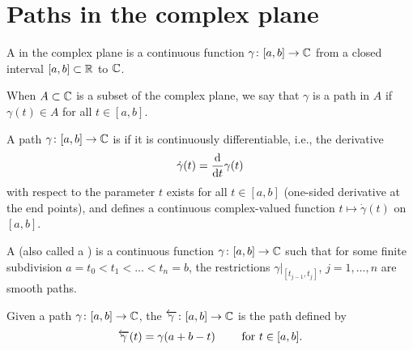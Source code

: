 \section{Paths in the complex plane}

\begin{definition}
  \label{def:path}
  A  in the complex plane is a continuous function $\gamma \colon [a,b] \to \mathbb{C}$
  from a closed interval $[a,b] \subset \mathbb{R}$ to $\mathbb{C}$.

  When $A \subset \mathbb{C}$ is a subset of the complex plane, we say that $\gamma$ is a path in $A$
  if $\gamma(t) \in A$ for all $t \in [a,b]$.
\end{definition}

\begin{definition}
  \label{def:smooth_path}
  A path $\gamma \colon [a,b] \to \mathbb{C}$ is 
  if it is continuously differentiable, i.e., the derivative
  \begin{align*}
    \dot{\gamma}(t) = \frac{\mathrm{d}}{\mathrm{d} t} \gamma(t)
  \end{align*}
  with respect to the parameter $t$
  exists for all $t \in [a,b]$ (one-sided derivative at the end points),
  and defines a continuous complex-valued function $t \mapsto \dot{\gamma}(t)$
  on $[a,b]$.
\end{definition}

\begin{definition}
  \label{def:contour}
  A  (also called a )
  is a continuous function $\gamma \colon [a,b] \to \mathbb{C}$
  such that for some finite subdivision $a = t_0 < t_1 < \ldots < t_n = b$,
  the restrictions $\gamma|_{[t_{j-1},t_j]}$, $j = 1, \ldots, n$ are smooth paths.
\end{definition}

\begin{definition}
  \label{def:reverse_path}
  Given a path $\gamma \colon [a,b] \to \mathbb{C}$,
  the  $\overleftarrow{\gamma} \colon [a,b] \to \mathbb{C}$
  is the path defined by
  \begin{align*}
    \overleftarrow{\gamma}(t) = \gamma(a+b-t) \qquad \text{ for } t \in [a,b] .
  \end{align*}
\end{definition}

